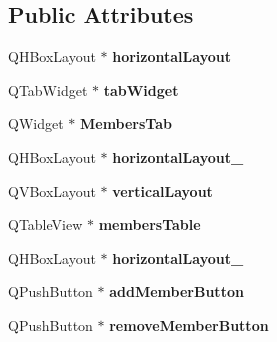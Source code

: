 \subsection*{Public Attributes}
\begin{DoxyCompactItemize}
\item 
\mbox{\label{class_ui___admin_window_a6fd6afc76b889bbac9b4334a703ee549}} 
Q\+H\+Box\+Layout $\ast$ {\bfseries horizontal\+Layout}
\item 
\mbox{\label{class_ui___admin_window_a2f61ae137e32be6c7c69db13eb2ced38}} 
Q\+Tab\+Widget $\ast$ {\bfseries tab\+Widget}
\item 
\mbox{\label{class_ui___admin_window_acf3d5d3d8e366f15962780c7830019d2}} 
Q\+Widget $\ast$ {\bfseries Members\+Tab}
\item 
\mbox{\label{class_ui___admin_window_a8e04de9410a29def2275242f4f94b88b}} 
Q\+H\+Box\+Layout $\ast$ {\bfseries horizontal\+Layout\+\_}
\item 
\mbox{\label{class_ui___admin_window_a33486ff8f11715d9bbdb9dd5fa77eb36}} 
Q\+V\+Box\+Layout $\ast$ {\bfseries vertical\+Layout}
\item 
\mbox{\label{class_ui___admin_window_a3e338fb9ba4e065ef64265922e9fdc09}} 
Q\+Table\+View $\ast$ {\bfseries members\+Table}
\item 
\mbox{\label{class_ui___admin_window_a04ded2559805fe42878d03f2f284b031}} 
Q\+H\+Box\+Layout $\ast$ {\bfseries horizontal\+Layout\+\_}
\item 
\mbox{\label{class_ui___admin_window_a35495dc1e3ce72d96f92f35ce2642ae4}} 
Q\+Push\+Button $\ast$ {\bfseries add\+Member\+Button}
\item 
\mbox{\label{class_ui___admin_window_a7d6af77120832ba68335bbe7e3e11ebb}} 
Q\+Push\+Button $\ast$ {\bfseries remove\+Member\+Button}
\item 
\mbox{\label{class_ui___admin_window_a5ddc6f4f3e6e62f1e089ec935c76c1b1}} 

\end{DoxyCompactItemize}
